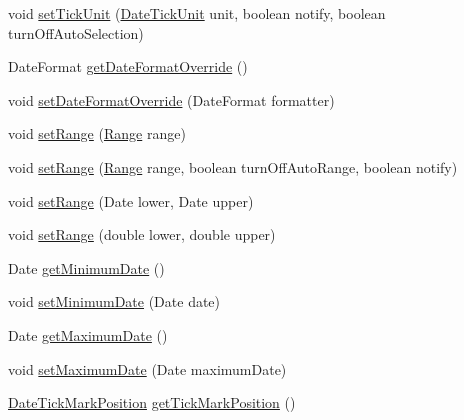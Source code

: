 \begin{DoxyCompactItemize}
\item 
void \mbox{\hyperlink{classorg_1_1jfree_1_1chart_1_1axis_1_1_date_axis_afaf416d81d2754d710734ebb2ed4c036}{set\+Tick\+Unit}} (\mbox{\hyperlink{classorg_1_1jfree_1_1chart_1_1axis_1_1_date_tick_unit}{Date\+Tick\+Unit}} unit, boolean notify, boolean turn\+Off\+Auto\+Selection)
\item 
Date\+Format \mbox{\hyperlink{classorg_1_1jfree_1_1chart_1_1axis_1_1_date_axis_a563a0d5eddcd4b7c4cb36f1743de7697}{get\+Date\+Format\+Override}} ()
\item 
void \mbox{\hyperlink{classorg_1_1jfree_1_1chart_1_1axis_1_1_date_axis_a2d545373549ccef5dca1c7e2d206fd3b}{set\+Date\+Format\+Override}} (Date\+Format formatter)
\item 
void \mbox{\hyperlink{classorg_1_1jfree_1_1chart_1_1axis_1_1_date_axis_a8dc808d1cbbae4cf0b97dc316a963859}{set\+Range}} (\mbox{\hyperlink{classorg_1_1jfree_1_1data_1_1_range}{Range}} range)
\item 
void \mbox{\hyperlink{classorg_1_1jfree_1_1chart_1_1axis_1_1_date_axis_a7b9cc10a269563c2a450213c6420b8cc}{set\+Range}} (\mbox{\hyperlink{classorg_1_1jfree_1_1data_1_1_range}{Range}} range, boolean turn\+Off\+Auto\+Range, boolean notify)
\item 
void \mbox{\hyperlink{classorg_1_1jfree_1_1chart_1_1axis_1_1_date_axis_a2b175add3068d8e671d025098bbc256b}{set\+Range}} (Date lower, Date upper)
\item 
void \mbox{\hyperlink{classorg_1_1jfree_1_1chart_1_1axis_1_1_date_axis_ad0729b3e882349ba8fccf3d05db25779}{set\+Range}} (double lower, double upper)
\item 
Date \mbox{\hyperlink{classorg_1_1jfree_1_1chart_1_1axis_1_1_date_axis_a7749424d09b9dc565b489112aa186672}{get\+Minimum\+Date}} ()
\item 
void \mbox{\hyperlink{classorg_1_1jfree_1_1chart_1_1axis_1_1_date_axis_aef8462c6877d21ffdbc2ae4fa0073469}{set\+Minimum\+Date}} (Date date)
\item 
Date \mbox{\hyperlink{classorg_1_1jfree_1_1chart_1_1axis_1_1_date_axis_a7459e23be2ccb30ff4be922caf3d579b}{get\+Maximum\+Date}} ()
\item 
void \mbox{\hyperlink{classorg_1_1jfree_1_1chart_1_1axis_1_1_date_axis_a39b7d4f271f0e436b2ddc59d942d493d}{set\+Maximum\+Date}} (Date maximum\+Date)
\item 
\mbox{\hyperlink{classorg_1_1jfree_1_1chart_1_1axis_1_1_date_tick_mark_position}{Date\+Tick\+Mark\+Position}} \mbox{\hyperlink{classorg_1_1jfree_1_1chart_1_1axis_1_1_date_axis_a19ad2cfdebcbf7aba66756d01873162d}{get\+Tick\+Mark\+Position}} ()

\end{DoxyCompactItemize}
